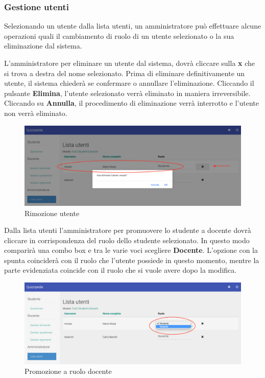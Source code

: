\documentclass[12pt,a4paper]{article}
\begin{document}
	\subsubsection{Gestione utenti}
	Selezionando un utente dalla lista utenti, un amministratore può effettuare alcune operazioni quali il cambiamento di ruolo di un utente selezionato o la sua eliminazione dal sistema.
		
	L'amministratore per eliminare un utente dal sistema, dovrà cliccare sulla \textbf{x} che si trova a destra del nome selezionato. Prima di eliminare definitivamente un utente, il sistema chiederà se confermare o annullare l'eliminazione. Cliccando il pulsante \textbf{Elimina}, l'utente selezionato verrà eliminato in maniera irreversibile. Cliccando su \textbf{Annulla}, il procedimento di eliminazione verrà interrotto e l'utente non verrà eliminato.
		\begin{figure}[H]
			\centering
			\includegraphics[width=1\linewidth]{../img/screenshot/rimozioneUtente.png}
			\caption{Rimozione utente}
			\label{Rimozione utente}
		\end{figure}
	Dalla lista utenti l'amministratore per promuovere lo studente a docente dovrà cliccare in corrispondenza del ruolo dello studente selezionato. In questo modo comparirà una combo box e tra le varie voci scegliere \textbf{Docente}. L'opzione con la spunta coinciderà con il ruolo che l'utente possiede in questo momento, mentre la parte evidenziata coincide con il ruolo che si vuole avere dopo la modifica.
	
	\begin{figure}[H]
		\centering
		\includegraphics[width=1\linewidth]{../img/screenshot/cambioRuoloStudDoc.png}
		\caption{Promozione a ruolo docente}
		\label{Promozione a ruolo docente}
	\end{figure}
	
\end{document}
